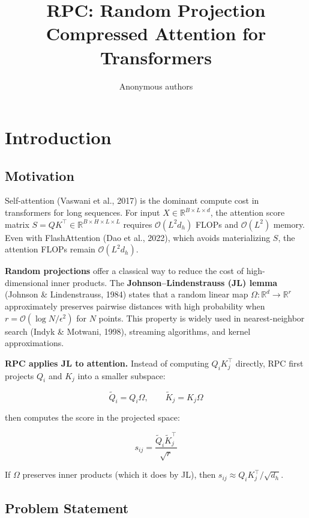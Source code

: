 \title{\textbf{RPC: Random Projection Compressed Attention for Transformers}}

\author{Anonymous authors}



\section{Introduction}

\subsection{Motivation}

Self-attention (Vaswani et al., 2017) is the dominant compute cost in 
transformers for long sequences. For input $X \in \mathbb{R}^{B \times L \times d}$, 
the attention score matrix $S = Q K^\top \in \mathbb{R}^{B \times H \times L \times L}$ 
requires $\mathcal{O}(L^2 d_h)$ FLOPs and $\mathcal{O}(L^2)$ memory. Even 
with FlashAttention (Dao et al., 2022), which avoids materializing $S$, the 
attention FLOPs remain $\mathcal{O}(L^2 d_h)$.

\textbf{Random projections} offer a classical way to reduce the cost of 
high-dimensional inner products. The \textbf{Johnson--Lindenstrauss (JL) lemma} 
(Johnson \& Lindenstrauss, 1984) states that a random linear map 
$\Omega : \mathbb{R}^d \to \mathbb{R}^r$ approximately preserves pairwise 
distances with high probability when $r = \mathcal{O}(\log N / \epsilon^2)$ 
for $N$ points. This property is widely used in nearest-neighbor search 
(Indyk \& Motwani, 1998), streaming algorithms, and kernel approximations.

\textbf{RPC applies JL to attention.} Instead of computing $Q_i K_j^\top$ directly, 
RPC first projects $Q_i$ and $K_j$ into a smaller subspace:

\[
\tilde{Q}_i = Q_i \Omega, \qquad \tilde{K}_j = K_j \Omega
\tag{1.1}
\]

then computes the score in the projected space:

\[
s_{ij} = \frac{\tilde{Q}_i \tilde{K}_j^\top}{\sqrt{r}}
\tag{1.2}
\]

If $\Omega$ preserves inner products (which it does by JL), then 
$s_{ij} \approx Q_i K_j^\top / \sqrt{d_h}$.

\subsection{Problem Statement}

